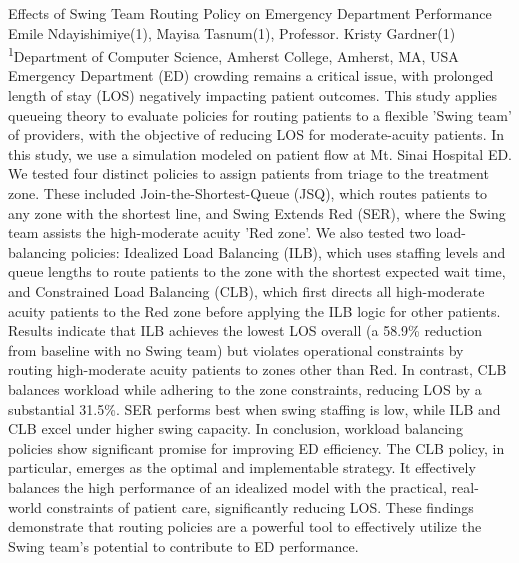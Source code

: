 \makeabstract
{
Effects of Swing Team Routing Policy on Emergency Department Performance
}
{
Emile Ndayishimiye(1), Mayisa Tasnum(1), Professor. Kristy Gardner(1)
}
{
\textsuperscript{1}Department of Computer Science, Amherst College, Amherst, MA, USA
}
{
Emergency Department (ED) crowding remains a critical issue, with prolonged length of stay (LOS) negatively impacting patient outcomes. This study applies queueing theory to evaluate policies for routing patients to a flexible 'Swing team' of providers, with the objective of reducing LOS for moderate-acuity patients. 
}
{
In this study, we use a simulation modeled on patient flow at Mt. Sinai Hospital ED. We tested four distinct policies to assign patients from triage to the treatment zone. These included Join-the-Shortest-Queue (JSQ), which routes patients to any zone with the shortest line, and Swing Extends Red (SER), where the Swing team assists the high-moderate acuity 'Red zone’. We also tested two load-balancing policies: Idealized Load Balancing (ILB), which uses staffing levels and queue lengths to route patients to the zone with the shortest expected wait time, and Constrained Load Balancing (CLB), which first directs all high-moderate acuity patients to the Red zone before applying the ILB logic for other patients. 
}
{
Results indicate that ILB achieves the lowest LOS overall (a 58.9\% reduction from baseline with no Swing team) but violates operational constraints by routing high-moderate acuity patients to zones other than Red. In contrast, CLB balances workload while adhering to the zone constraints, reducing LOS by a substantial 31.5\%. SER performs best when swing staffing is low, while ILB and CLB excel under higher swing capacity. 
}
{
In conclusion, workload balancing policies show significant promise for improving ED efficiency. The CLB policy, in particular, emerges as the optimal and implementable strategy. It effectively balances the high performance of an idealized model with the practical, real-world constraints of patient care, significantly reducing LOS. These findings demonstrate that routing policies are a powerful tool to effectively utilize the Swing team's potential to contribute to ED performance.
}

\newpage
